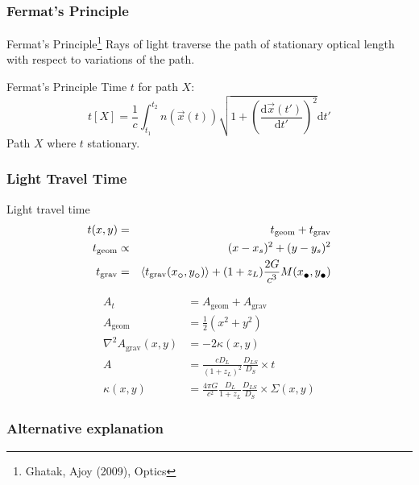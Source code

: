 \documentclass{beamer}
\newcommand{\subcirc}{{\lower.33ex\hbox{$\circ$}}}
\newcommand{\subbullet}{{\lower.33ex\hbox{$\bullet$}}}
\begin{document}
\begin{frame}
  \frametitle{Fermat’s Principle}
  \begin{block}{Fermat’s Principle\footnote{Ghatak, Ajoy (2009), Optics}}
    Rays of light traverse the path of stationary optical length\\
    with respect to variations of the path.
    
  \end{block}

  \begin{block}{Fermat’s Principle}
    Time $t$ for path $X$:
    $$t\left[X\right] = \frac{1}{c}\int_{t_1}^{t_2}n\left(\vec{x}\left(t\right)\right)\sqrt{1+\left(\frac{\text{d}\vec{x}\left(t'\right)}{\text{d}t'}\right)^2}\text{d}t'$$
    Path $X$ where $t$ stationary.
  \end{block}
\end{frame}


\begin{frame}
	\frametitle{Light Travel Time}
	\begin{block}{Light travel time}
		\begin{eqnarray}
			t(x,y) &=& t_\text{geom} + t_\text{grav} \\
			t_\text{geom} &\propto & (x - x_s)^2 + (y-y_s)^2 \\
			t_\text{grav} &=& \left\langle t_\text{grav}(x_\subcirc,y_\subcirc) \right\rangle + (1+z_L) \frac{2G}{c^3} M(x_\subbullet,y_\subbullet)
		\end{eqnarray}
	\end{block}
\end{frame}



\begin{frame}
  \begin{align}
    A_t &= A_\text{geom} + A_\text{grav}\\
    A_\text{geom} &= \frac{1}{2}\left(x^2+y^2\right)\\
    \nabla^2 A_\text{grav}\left(x,y\right) &= -2\kappa\left(x,y\right)\\
    A           &= \frac{cD_L}{(1+z_L)^2} \frac{D_{LS}}{D_S} \times t \\
    \kappa(x,y) &= \frac{4\pi G}{c^2} \frac{D_L}{1+z_L} \frac{D_{LS}}{D_S} \times \Sigma(x,y)
  \end{align}
  
\end{frame}


\begin{frame}
  \frametitle{Alternative explanation}
	
\end{frame}
\end{document}
